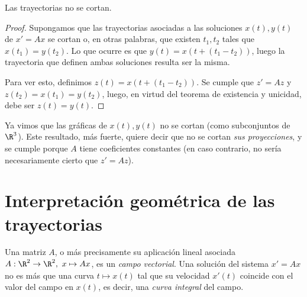 \documentclass[../main.tex]{subfiles}
\begin{document}
\begin{theorem}
  Las trayectorias no se cortan.
  \begin{proof}
    Supongamos que las trayectorias asociadas a las soluciones \(x(t), y(t)\) de
    \(x' = Ax\) se cortan o, en otras palabras, que existen \(t_1, t_2\) tales
    que \(x(t_1) = y(t_2)\). Lo que ocurre es que \(y(t) = x(t + (t_1-t_2))\),
    luego la trayectoria que definen ambas soluciones resulta ser la misma.

    Para ver esto, definimos \(z(t) = x(t + (t_1-t_2))\). Se cumple que \(z' =
    Az\) y \(z(t_2) = x(t_1) = y(t_2)\), luego, en virtud del teorema de
    existencia y unicidad, debe ser \(z(t) = y(t)\).
  \end{proof}
\end{theorem}

\begin{remark}
  Ya vimos que las gráficas de \(x(t), y(t)\) no se cortan (como subconjuntos de
  \(\R^3\)). Este resultado, más fuerte, quiere decir que no se cortan \emph{sus
    proyecciones}, y se cumple porque \(A\) tiene coeficientes constantes (en
  caso contrario, no sería necesariamente cierto que \(z' = Az\)).
\end{remark}

\section{Interpretación geométrica de las trayectorias}

Una matriz \(A\), o más precisamente su aplicación lineal asociada \(A : \R^2
\to \R^2,\ x \mapsto Ax\), es un \emph{campo vectorial}. Una solución del
sistema \(x' = Ax\) no es más que una curva \(t \mapsto x(t)\) tal que su
velocidad \(x'(t)\) coincide con el valor del campo en \(x(t)\), es decir, una
\emph{curva integral} del campo.
\end{document}
